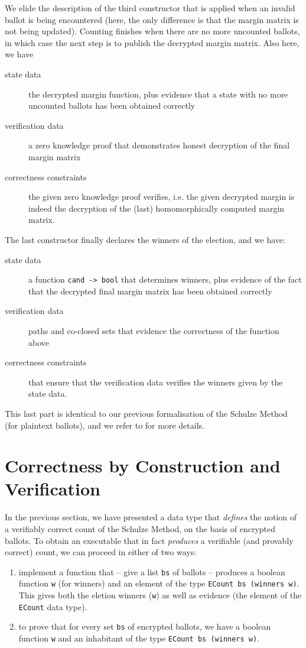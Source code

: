 \documentclass{llncs}
\begin{document}
We elide the description of the third constructor that is applied
when an invalid ballot is being encountered (here, the only
difference is that the margin matrix is not being updated). 
Counting finishes when there are no more uncounted ballots, in
which case the next step is to publish the decrypted margin matrix.
Also here, we have
\begin{description}
  \item[state data] the decrypted margin function, plus evidence
  that a state with no more uncounted ballots has been obtained
  correctly
  \item[verification data] a zero knowledge proof that demonstrates
  honest decryption of the final margin matrix
  \item[correctness constraints] the given zero knowledge proof
  verifies, i.e. the given decrypted margin is indeed the decryption
  of the (last) homomorphically computed margin matrix.
\end{description} 

The last constructor finally declares the winners of the election,
and we have:
\begin{description}
  \item[state data] a function \texttt{cand -> bool} that determines
  winners, plus evidence of the fact that the decrypted final margin
  matrix has been obtained correctly
  \item[verification data] 
   paths and co-closed sets that evidence the correctness of the
   function above
 \item[correctness constraints] that ensure that the verification
 data verifies the winners given by the state data.
\end{description}
This last part is identical to our previous formalisation of the
Schulze Method (for plaintext ballots), and we refer to 
\cite{Pattinson:2017:SVE} for more details.


\section{Correctness by Construction and Verification}
\label{sec:correct}

In the previous section, we have presented a data type that
\emph{defines} the notion of a verifiably correct count of the
Schulze Method, on the basis of encrypted ballots. To obtain an
executable that in fact \emph{produces} a verifiable (and provably
correct) count, we can proceed in either of two ways:
\begin{enumerate}
  \item implement a function that -- give a list \texttt{bs} of
  ballots -- produces a boolean function \texttt{w} (for winners) and an
  element of the type \texttt{ECount bs (winners w)}. This gives
  both the eletion winners (\texttt{w}) as well as evidence (the
  element of the \texttt{ECount} data type).
  \item to prove that for every set \texttt{bs} of encrypted
  ballots, we have a boolean function \texttt{w} and an inhabitant
  of the type \texttt{ECount bs (winners w)}.
\end{enumerate}
\end{document}
